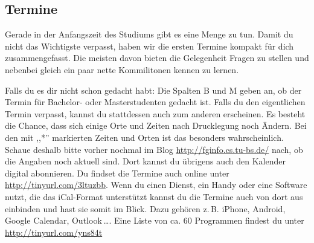 \subsection{Termine}
\label{termine}
	\begin{multicols}{2}
	Gerade in der Anfangszeit des Studiums gibt es eine Menge zu tun. Damit du
	nicht das Wichtigste verpasst, haben wir die ersten Termine kompakt für
	dich zusammengefasst. Die meisten davon bieten die Gelegenheit Fragen zu
	stellen und nebenbei gleich ein paar nette Kommilitonen kennen zu lernen.

	Falls du  es dir nicht schon gedacht habt: Die Spalten B und M geben an,
	ob der Termin für Bachelor- oder Masterstudenten gedacht
        ist. Falls du den eigentlichen Termin verpasst, kannst du
        stattdessen auch zum anderen erscheinen. Es besteht die Chance, dass sich einige Orte
	und Zeiten
	nach Drucklegung noch Ändern.  Bei den mit ,,*'' markierten Zeiten und
	Orten ist das besonders wahrscheinlich. Schaue deshalb bitte vorher
	nochmal im Blog \url{http://fginfo.cs.tu-bs.de/} nach, ob die Angaben
	noch aktuell sind. Dort kannst du übrigens auch den Kalender digital abonnieren.
	Du findset die Termine auch online unter \url{http://tinyurl.com/3ltuzbb}.
	Wenn du einen Dienst, ein Handy oder eine Software nutzt, die das iCal-Format unterstützt
	kannst du die Termine auch von dort aus einbinden und hast sie somit im Blick. 
	Dazu gehören z.\,B. iPhone, Android, Google Calendar, Outlook\,\dots. Eine Liste 
	von ca. 60 Programmen findest du unter 	\url{http://tinyurl.com/yns84t}
	\end{multicols}

